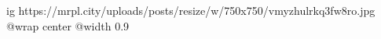  
 
 
 
 

\ifcmt
  ig https://mrpl.city/uploads/posts/resize/w/750x750/vmyzhulrkq3fw8ro.jpg
  @wrap center
  @width 0.9
\fi
